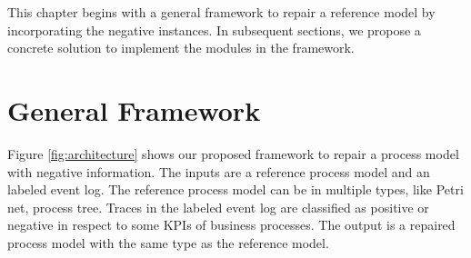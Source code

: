 

This chapter begins with a general framework to repair a reference model by incorporating the negative instances. In subsequent sections, we propose a concrete solution to implement the modules in the framework. 
\section{General Framework}
Figure \ref{fig:architecture} shows our proposed framework to repair a process model with negative information. The inputs are a reference process model and an labeled event log. The reference process model can be in multiple types, like Petri net, process tree. Traces in the labeled event log are classified as positive or negative in respect to some KPIs of business processes. The output is a repaired process model with the same type as the reference model.

